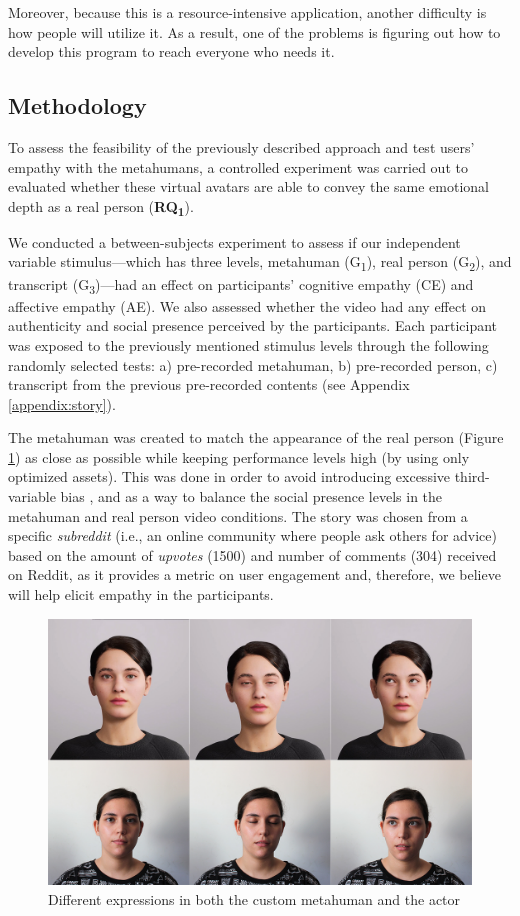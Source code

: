 Moreover, because this is a resource-intensive application, another difficulty is how people will utilize it. As a result, one of the problems is figuring out how to develop this program to reach everyone who needs it. 

\subsection{Methodology}
To assess the feasibility of the previously described approach and test users' empathy with the metahumans, a controlled experiment was carried out to evaluated whether these virtual avatars are able to convey the same emotional depth as a real person (\textbf{RQ\textsubscript{1}}).

We conducted a between-subjects experiment to assess if our independent variable stimulus---which has three levels, metahuman (G\textsubscript{1}), real person (G\textsubscript{2}), and transcript (G\textsubscript{3})---had an effect on participants' cognitive empathy (CE) and affective empathy (AE). We also assessed whether the video had any effect on authenticity and social presence perceived by the participants. Each participant was exposed to the previously mentioned stimulus levels through the following randomly selected tests: a) pre-recorded metahuman, b) pre-recorded person, c) transcript from the previous pre-recorded contents (see Appendix \ref{appendix:story}).

The metahuman was created to match the appearance of the real person (Figure \ref{fig:customMeta}) as close as possible while keeping performance levels high (by using only optimized assets). This was done in order to avoid introducing excessive third-variable bias \cite{ROT19}, and as a way to balance the social presence levels in the metahuman and real person video conditions. The story was chosen from a specific \textit{subreddit} (i.e., an online community where people ask others for advice) based on the amount of \textit{upvotes} (1500) and number of comments (304) received on Reddit, as it provides a metric on user engagement and, therefore, we believe will help elicit empathy in the participants.

\begin{figure}[h!]
\includegraphics[width=\textwidth]{figures/personavatar.jpg}
\centering
\caption{Different expressions in both the custom metahuman and the actor}
\label{fig:customMeta}
\end{figure}

